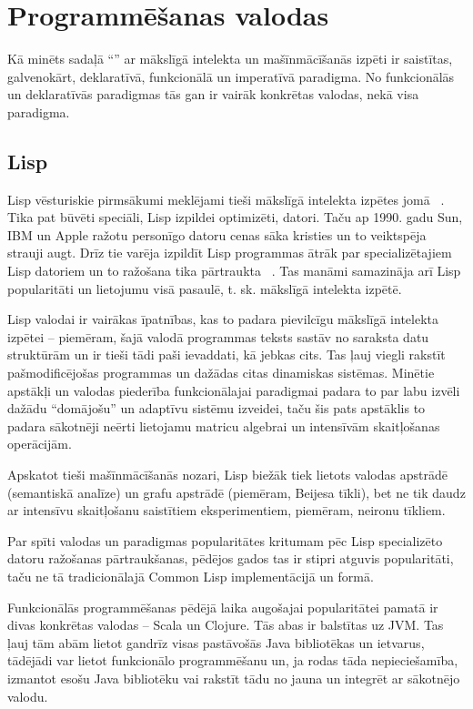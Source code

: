 \documentclass{ludis}
\begin{document}
\section{Programmēšanas valodas}
Kā minēts sadaļā ``'' ar mākslīgā intelekta un mašīnmācīšanās izpēti ir saistītas, galvenokārt, deklaratīvā, funkcionālā un imperatīvā paradigma. No funkcionālās un deklaratīvās paradigmas tās gan ir vairāk konkrētas valodas, nekā visa paradigma.

\subsection{Lisp}
Lisp vēsturiskie pirmsākumi meklējami tieši mākslīgā intelekta izpētes jomā ~\cite{hist_lisp}. Tika pat būvēti speciāli, Lisp izpildei optimizēti, datori. Taču ap 1990. gadu Sun, IBM un Apple ražotu personīgo datoru cenas sāka kristies un to veiktspēja strauji augt. Drīz tie varēja izpildīt Lisp programmas ātrāk par specializētajiem Lisp datoriem un to ražošana tika pārtraukta ~\cite[p.~209--210]{crevier_1993}. Tas manāmi samazināja arī Lisp popularitāti un lietojumu visā pasaulē, t. sk. mākslīgā intelekta izpētē.

Lisp valodai ir vairākas īpatnības, kas to padara pievilcīgu mākslīgā intelekta izpētei -- piemēram, šajā valodā programmas teksts sastāv no saraksta datu struktūrām un ir tieši tādi paši ievaddati, kā jebkas cits. Tas ļauj viegli rakstīt pašmodificējošas programmas un dažādas citas dinamiskas sistēmas. Minētie apstākļi un valodas piederība funkcionālajai paradigmai padara to par labu izvēli dažādu ``domājošu'' un adaptīvu sistēmu izveidei, taču šis pats apstāklis to padara sākotnēji neērti lietojamu matricu algebrai un intensīvām skaitļošanas operācijām. 

Apskatot tieši mašīnmācīšanās nozari, Lisp biežāk tiek lietots valodas apstrādē (semantiskā analīze) un grafu apstrādē (piemēram, Beijesa tīkli), bet ne tik daudz ar intensīvu skaitļošanu saistītiem eksperimentiem, piemēram, neironu tīkliem.

Par spīti valodas un paradigmas popularitātes kritumam pēc Lisp specializēto datoru ražošanas pārtraukšanas, pēdējos gados tas ir stipri atguvis popularitāti, taču ne tā tradicionālajā Common Lisp implementācijā un formā.

Funkcionālās programmēšanas pēdējā laika augošajai popularitātei pamatā ir divas konkrētas valodas -- Scala un Clojure. Tās abas ir balstītas uz JVM. Tas ļauj tām abām lietot gandrīz visas pastāvošās Java bibliotēkas un ietvarus, tādējādi var lietot funkcionālo programmēšanu un, ja rodas tāda nepieciešamība, izmantot esošu Java bibliotēku vai rakstīt tādu no jauna un integrēt ar sākotnējo valodu.
\end{document}
